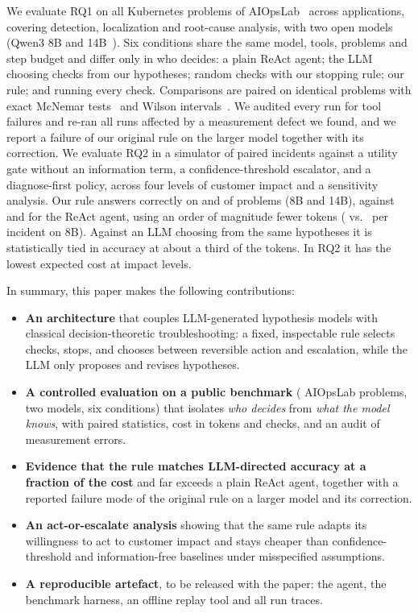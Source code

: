 We evaluate RQ1 on all \nProblems{} Kubernetes problems of AIOpsLab~\cite{chen2025aiopslab}
across \nApps{} applications, covering detection, localization and root-cause
analysis, with two open models (Qwen3 8B and 14B~\cite{yang2025qwen3}). Six
conditions share the same model, tools, problems and step budget and differ only in
who decides: a plain ReAct agent; the LLM choosing checks from our hypotheses;
random checks with our stopping rule; our rule; and running every check.
Comparisons are paired on identical problems with exact McNemar
tests~\cite{mcnemar1947note} and Wilson intervals~\cite{wilson1927probable}. We
audited every run for tool failures and re-ran all runs affected by a measurement
defect we found, and we report a failure of our original rule on the larger model
together with its correction. We evaluate RQ2 in a simulator of paired incidents
against a utility gate without an information term, a confidence-threshold
escalator, and a diagnose-first policy, across four levels of customer impact and
a sensitivity analysis. Our rule answers correctly on \accOursEight{} and
\accOursFourteen{} of problems (8B and 14B), against \accReactEight{} and
\accReactFourteen{} for the ReAct agent, using an order of magnitude fewer tokens
(\tokOursEight{} vs.\ \tokReactEight{} per incident on 8B). Against an LLM choosing
from the same hypotheses it is statistically tied in accuracy at about a third of
the tokens. In RQ2 it has the lowest expected cost at \rqTwoWins{} impact levels.

In summary, this paper makes the following contributions:
\begin{itemize}
  \item \textbf{An architecture} that couples LLM-generated hypothesis models with
        classical decision-theoretic troubleshooting: a fixed, inspectable rule
        selects checks, stops, and chooses between reversible action and
        escalation, while the LLM only proposes and revises hypotheses.
  \item \textbf{A controlled evaluation on a public benchmark} (\nProblems{}
        AIOpsLab problems, two models, six conditions) that isolates \emph{who
        decides} from \emph{what the model knows}, with paired statistics, cost in
        tokens and checks, and an audit of measurement errors.
  \item \textbf{Evidence that the rule matches LLM-directed accuracy at a fraction
        of the cost} and far exceeds a plain ReAct agent, together with a reported
        failure mode of the original rule on a larger model and its correction.
  \item \textbf{An act-or-escalate analysis} showing that the same rule adapts its
        willingness to act to customer impact and stays cheaper than
        confidence-threshold and information-free baselines under misspecified
        assumptions.
  \item \textbf{A reproducible artefact}, to be released with the paper: the
        agent, the benchmark harness, an offline replay tool and all run traces.
\end{itemize}
